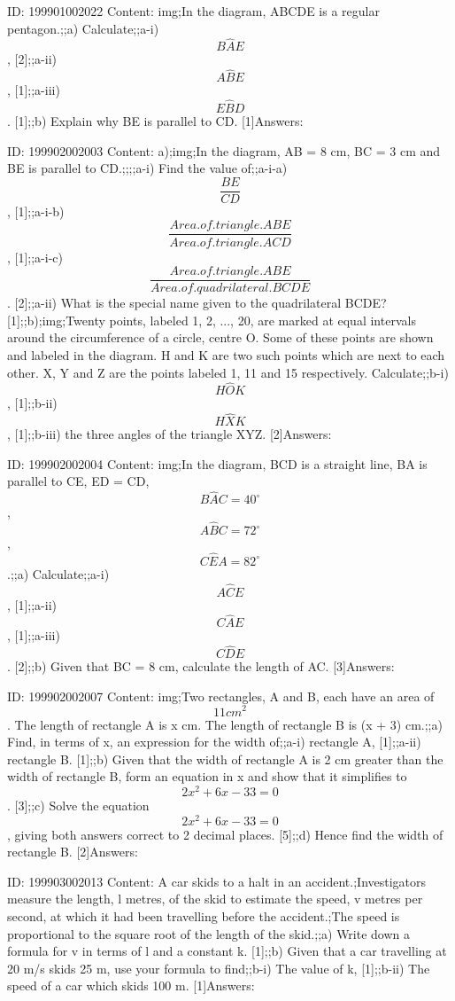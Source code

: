\documentclass{article}
\begin{document}
ID: 199901002022
Content:
img;In the diagram, ABCDE is a regular pentagon.;;a) Calculate;;a-i) $$B \hat AE$$, [2];;a-ii) $$A \hat BE$$, [1];;a-iii) $$E \hat BD$$. [1];;b) Explain why BE is parallel to CD. [1]Answers:

ID: 199902002003
Content:
a);img;In the diagram, AB = 8 cm, BC = 3 cm and BE is parallel to CD.;;;;a-i) Find the value of;;a-i-a) $$\frac{BE}{CD}$$, [1];;a-i-b) $$\frac{Area.of.triangle.ABE}{Area.of.triangle.ACD}$$, [1];;a-i-c) $$\frac{Area.of.triangle.ABE}{Area.of.quadrilateral.BCDE}$$. [2];;a-ii) What is the special name given to the quadrilateral BCDE? [1];;b);img;Twenty points, labeled 1, 2, ..., 20, are marked at equal intervals around the circumference of a circle, centre O. Some of these points are shown and labeled in the diagram. H and K are two such points which are next to each other. X, Y and Z are the points labeled 1, 11 and 15 respectively. Calculate;;b-i) $$H \hat OK$$, [1];;b-ii) $$H \hat XK$$, [1];;b-iii) the three angles of the triangle XYZ. [2]Answers:

ID: 199902002004
Content:
img;In the diagram, BCD is a straight line, BA is parallel to CE, ED = CD, $$B \hat AC=40^{\circ}$$, $$A \hat BC=72^{\circ}$$, $$C \hat EA=82^{\circ}$$.;;a) Calculate;;a-i) $$A \hat CE$$, [1];;a-ii) $$C \hat AE$$, [1];;a-iii) $$C \hat DE$$. [2];;b) Given that BC = 8 cm, calculate the length of AC. [3]Answers:

ID: 199902002007
Content:
img;Two rectangles, A and B, each have an area of $$11cm^{2} $$. The length of rectangle A is x cm. The length of rectangle B is (x + 3) cm.;;a) Find, in terms of x, an expression for the width of;;a-i) rectangle A, [1];;a-ii) rectangle B. [1];;b) Given that the width of rectangle A is 2 cm greater than the width of rectangle B, form an equation in x and show that it simplifies to $$2x^{2} +6x-33=0$$. [3];;c) Solve the equation $$2x^{2} +6x-33=0$$, giving both answers correct to 2 decimal places. [5];;d) Hence find the width of rectangle B. [2]Answers:

ID: 199903002013
Content:
A car skids to a halt in an accident.;Investigators measure the length, l metres, of the skid to estimate the speed, v metres per second, at which it had been travelling before the accident.;The speed is proportional to the square root of the length of the skid.;;a) Write down a formula for v in terms of l and a constant k.   [1];;b) Given that a car travelling at 20 m/s skids 25 m, use your formula to find;;b-i) The value of k,   [1];;b-ii) The speed of a car which skids 100 m.   [1]Answers:
\end{document}
